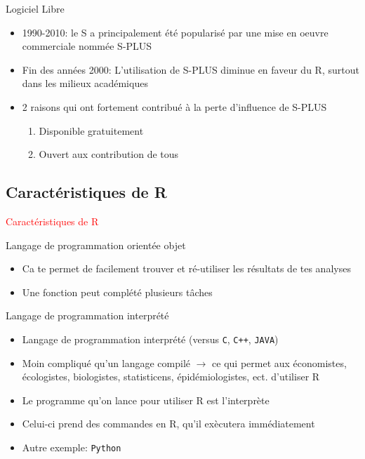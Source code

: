 \documentclass[11pt]{beamer}\usepackage[]{graphicx}\usepackage[]{color}
\newcommand{\code}[1]{\texttt{#1}}
\begin{document}
\begin{frame}{Logiciel Libre}
\begin{itemize}
  \setlength\itemsep{2em}
\item 1990-2010: le S a principalement \'{e}t\'{e} popularis\'{e} par une mise en oeuvre commerciale nomm\'{e}e S-PLUS
\pause \item Fin des ann\'{e}es 2000: L'utilisation de S-PLUS diminue en faveur du R, surtout dans les milieux acad\'{e}miques
\pause \item 2 raisons qui ont fortement contribu\'{e} \`{a} la perte d'influence de S-PLUS
\begin{enumerate}
\item \normalsize Disponible gratuitement
\pause \item Ouvert aux contribution de tous
\end{enumerate}
\end{itemize}
\end{frame}



\subsection{Caract\'{e}ristiques de R}

\begin{frame}
 \begin{center}
  \Huge{\textcolor{red}{Caract\'{e}ristiques de R}}
 \end{center}
\end{frame}



\begin{frame}{Langage de programmation orientée objet}
\begin{itemize}
  \setlength\itemsep{2em}
\item Ca te permet de facilement trouver et ré-utiliser les résultats de tes analyses
\pause \item Une fonction peut complété plusieurs t\^{a}ches
\end{itemize}
\end{frame}


\begin{frame}{Langage de programmation interpr\'{e}t\'{e}}
\begin{itemize}
  \setlength\itemsep{2em}
\item Langage de programmation interpr\'{e}t\'{e} (versus \code{C}, \code{C++}, \code{JAVA})
\item Moin compliqué qu'un langage compilé $\rightarrow$ ce qui permet aux économistes, écologistes, biologistes, statisticens, épidémiologistes, ect. d'utiliser R  
\pause \item Le programme qu'on lance pour utiliser R est l'interpr\`{e}te
\pause \item Celui-ci prend des commandes en R, qu'il ex\`{e}cutera imm\'{e}diatement
\pause \item  Autre exemple: \code{Python}
\end{itemize}
\end{frame}
\end{document}
